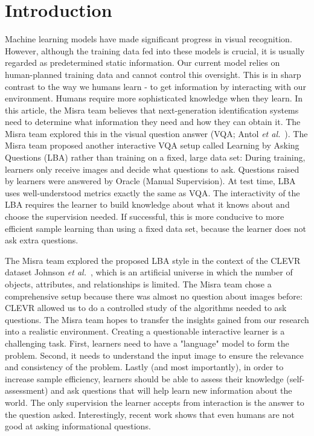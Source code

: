 \documentclass[10pt,twocolumn,letterpaper]{article}
\begin{document}
    \section{Introduction}
    Machine learning models have made significant progress in visual recognition. However, although the training data fed into these models is crucial, it is usually regarded as predetermined static information. Our current model relies on human-planned training data and cannot control this oversight. This is in sharp contrast to the way we humans learn - to get information by interacting with our environment. Humans require more sophisticated knowledge when they learn. In this article, the Misra team believes that next-generation identification systems need to determine what information they need and how they can obtain it. The Misra team explored this in the visual question answer (VQA; Antol \emph{et al.}~\cite{[4]}). The Misra team proposed another interactive VQA setup called Learning by Asking Questions (LBA) rather than training on a fixed, large data set: During training, learners only receive images and decide what questions to ask. Questions raised by learners were answered by Oracle (Manual Supervision). At test time, LBA uses well-understood metrics exactly the same as VQA. The interactivity of the LBA requires the learner to build knowledge about what it knows about and choose the supervision needed. If successful, this is more conducive to more efficient sample learning than using a fixed data set, because the learner does not ask extra questions.
    \par
    The Misra team explored the proposed LBA style in the context of the CLEVR dataset Johnson \emph{et al.}~\cite{[23]}, which is an artificial universe in which the number of objects, attributes, and relationships is limited. The Misra team chose a comprehensive setup because there was almost no question about images before: CLEVR allowed us to do a controlled study of the algorithms needed to ask questions. The Misra team hopes to transfer the insights gained from our research into a realistic environment. Creating a questionable interactive learner is a challenging task. First, learners need to have a "language" model to form the problem. Second, it needs to understand the input image to ensure the relevance and consistency of the problem. Lastly (and most importantly), in order to increase sample efficiency, learners should be able to assess their knowledge (self-assessment) and ask questions that will help learn new information about the world. The only supervision the learner accepts from interaction is the answer to the question asked. Interestingly, recent work shows that even humans are not good at asking informational questions.
\end{document}
